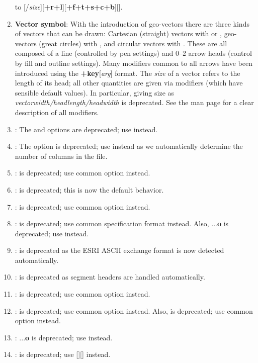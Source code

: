 \begin{enumerate}
		to [/{\it size}][{\bf +r+l}][{\bf +f+t+s+c+b}][].
	\item {\bf Vector symbol}: With the introduction of geo-vectors there are three kinds of vectors that can be drawn:
		Cartesian (straight) vectors with  or , geo-vectors (great circles) with , and circular vectors with .
		These are all composed of a line (controlled by pen settings) and 0--2 arrow heads (control by fill and outline settings).
		Many modifiers common to all arrows have been introduced using the {\bf +key}[{\it arg}] format.  The {\it size}
		of a vector refers to the length of its head; all other quantities are given via modifiers (which have sensible default values).
		In particular, giving size as {\it vectorwidth/headlength/headwidth} is deprecated.
		See the  man page for a clear description of all modifiers.
	\item {}: The  and  options are deprecated; use  instead.
	\item {}: The  option is deprecated; use  instead
		as we automatically determine the number of columns in the file.
	\item {}:  is deprecated; use common option  instead.
	\item {}:  is deprecated; this is now the default behavior.
	\item {}:  is deprecated; use common option  instead.
	\item {}:  is deprecated; use common specification format  instead. Also,
		...{\bf o} is deprecated; use  instead.
	\item {}:  is deprecated as the ESRI ASCII exchange format is now detected automatically.
	\item {}:  is deprecated as segment headers are handled automatically.
	\item {}:  is deprecated; use common option  instead.
	\item {}:  is deprecated; use common option  instead.  Also,
		 is deprecated; use common option  instead.
	\item {}: ...{\bf o} is deprecated; use  instead.
	\item {}:  is deprecated; use [][] instead.

\end{enumerate}
